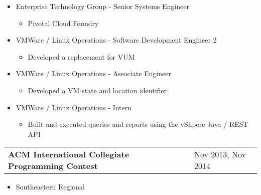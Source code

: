 \documentclass{book}
\newenvironment{myitemize}
{ \begin{itemize}
	\setlength{\itemsep}{0pt}
	\setlength{\parskip}{0pt}
	\setlength{\parsep}{0pt}     }
{ \end{itemize}                  }
\begin{document}
	\begin{myitemize}

		\item Enterprise Technology Group - Senior Systems Engineer

			\begin{myitemize}

					\item Pivotal Cloud Foundry

			\end{myitemize}

		\item VMWare / Linux Operations - Software Development Engineer 2

			\begin{myitemize}

					\item Developed a replacement for VUM

			\end{myitemize}	

		\item VMWare / Linux Operations - Associate Engineer 

			\begin{myitemize}

					\item Developed a VM state and location identifier

			\end{myitemize}	

		\item VMWare / Linux Operations - Intern 

			\begin{myitemize}

					\item Built and executed queries and reports using the vShpere Java / REST API

			\end{myitemize}	

		\end{myitemize}	
		
\begin{tabular}{L{4.75in}R{1.75in}}

	{\large {\bfseries ACM International Collegiate Programming Contest}} & Nov 2013, Nov 2014 \\	

\end{tabular}

	\begin{myitemize}
		\item Southeastern Regional
	\end{myitemize}
\end{document}
